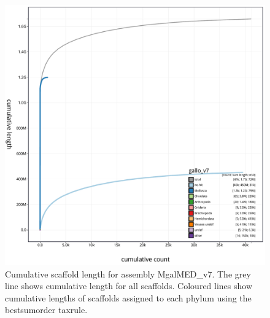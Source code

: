 \documentclass[11pt, a4paper]{article}
\begin{document}
\begin{figure}
	\includegraphics[width=\linewidth]{figures/btk_cumulative_MgalMED_v7}
	\caption{Cumulative scaffold length for assembly MgalMED\_v7. The grey line shows cumulative length for all scaffolds. Coloured lines show cumulative lengths of scaffolds assigned to each phylum using the bestsumorder taxrule.}
	\label{supfig:btk-cumul-MgalMED}
\end{figure}
\end{document}
